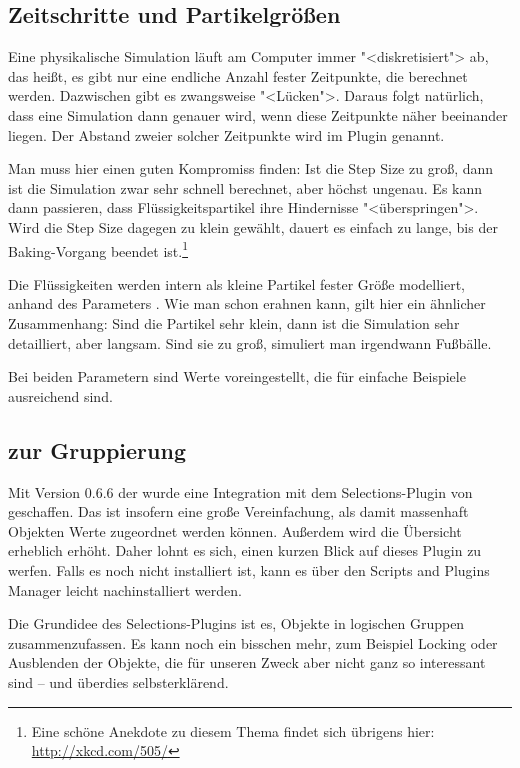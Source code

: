\documentclass[12pt,a4paper]{scrartcl}
\begin{document}
\subsection{Zeitschritte und Partikelgrößen}
Eine physikalische Simulation läuft am Computer immer "<diskretisiert">
ab, das heißt, es gibt nur eine endliche Anzahl fester Zeitpunkte, die
berechnet werden. Dazwischen gibt es zwangsweise "<Lücken">. Daraus
folgt natürlich, dass eine Simulation dann genauer wird, wenn diese
Zeitpunkte näher beeinander liegen. Der Abstand zweier solcher
Zeitpunkte wird im Plugin  genannt.

Man muss hier einen guten Kompromiss finden: Ist die Step Size zu groß,
dann ist die Simulation zwar sehr schnell berechnet, aber höchst
ungenau. Es kann dann passieren, dass Flüssigkeitspartikel ihre
Hindernisse "<überspringen">. Wird die Step Size dagegen zu klein
gewählt, dauert es einfach zu lange, bis der Baking-Vorgang beendet
ist.\footnote{Eine schöne Anekdote zu diesem Thema findet sich übrigens
hier: \url{http://xkcd.com/505/}}


Die Flüssigkeiten werden intern als kleine Partikel fester Größe
modelliert, anhand des Parameters . Wie man schon
erahnen kann, gilt hier ein ähnlicher Zusammenhang: Sind die Partikel
sehr klein, dann ist die Simulation sehr detailliert, aber langsam. Sind
sie zu groß, simuliert man irgendwann Fußbälle.

Bei beiden Parametern sind Werte voreingestellt, die für einfache
Beispiele ausreichend sind.

\subsection{ zur Gruppierung}
Mit Version 0.6.6 der \fluidsim wurde eine Integration mit dem
Selections-Plugin von \aoi geschaffen. Das ist insofern eine große
Vereinfachung, als damit massenhaft Objekten Werte zugeordnet werden
können. Außerdem wird die Übersicht erheblich erhöht. Daher lohnt es
sich, einen kurzen Blick auf dieses Plugin zu werfen. Falls es noch
nicht installiert ist, kann es über den Scripts and Plugins Manager
leicht nachinstalliert werden.

Die Grundidee des Selections-Plugins ist es, Objekte in logischen
Gruppen zusammenzufassen. Es kann noch ein bisschen mehr, zum Beispiel
Locking oder Ausblenden der Objekte, die für unseren Zweck aber nicht
ganz so interessant sind -- und überdies selbst\-er\-klä\-rend.
\end{document}
